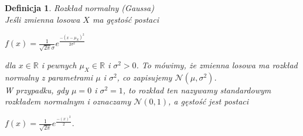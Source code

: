 \documentclass[12pt,a4paper]{report}
\newtheorem{definition}[theorem]{Definicja}
\begin{document}
\begin{definition}{Rozkład normalny (Gaussa) \cite[Rozdział 5.10]{jakubowski2004}\\}
Jeśli zmienna losowa $X$ ma gęstość postaci
\begin{center}
$f(x)=\frac{1}{\sqrt{2\pi}\sigma}e^\frac{-(x-\mu_X)^2}{2\sigma^2}$ 
\end{center}
dla $x \in \mathbb{R}$ i pewnych $\mu_X \in \mathbb{R}$ i $\sigma^2 >0$. To mówimy, że zmienna losowa ma rozkład normalny z parametrami $\mu$ i $\sigma^2$, co zapisujemy $\mathcal{N}(\mu, \sigma^2)$.\\
W przypadku, gdy $\mu=0$ i $\sigma^2=1$, to rozkład ten nazywamy standardowym rozkładem normalnym i oznaczamy $\mathcal{N}(0,1)$, a gęstość jest postaci
\begin{center}
$f(x)=\frac{1}{\sqrt{2\pi}}e^\frac{-(x)^2}{2}.$ 
\end{center}
\end{definition}


\end{document}
